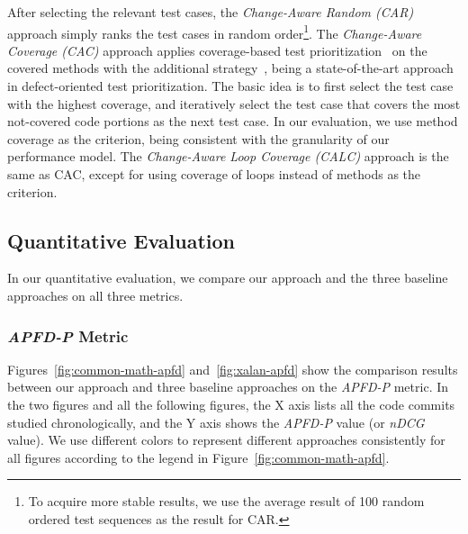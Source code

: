 After selecting the relevant test cases, the \textit{Change-Aware Random (CAR)} approach simply ranks the test cases in random order\footnote{To acquire more stable results, we use the average result of 100 random ordered test sequences as the result for CAR.}. The \textit{Change-Aware Coverage (CAC)} approach applies coverage-based test prioritization~\cite{Rother99:testprio} on the covered methods with the additional strategy~\cite{additionalTestPrior}, being a state-of-the-art approach in defect-oriented test prioritization. The basic idea is to first select the test case with the highest coverage, and iteratively select the test case that covers the most not-covered code portions as the next test case. In our evaluation, we use method coverage as the criterion, being consistent with the granularity of our performance model. The \textit{Change-Aware Loop Coverage (CALC)} approach is the same as CAC, except for using coverage of loops instead of methods as the criterion. 

\subsection{Quantitative Evaluation}
\label{subsec:results}
In our quantitative evaluation, we compare our approach and the three baseline approaches on all three metrics. 

\subsubsection{\textit{APFD-P} Metric}



Figures~\ref{fig:common-math-apfd} and~\ref{fig:xalan-apfd} show the comparison results between our approach and three baseline approaches on the \textit{APFD-P} metric. In the two figures and all the following figures, the X axis lists all the code commits studied chronologically, and the Y axis shows the \textit{APFD-P} value (or \textit{nDCG} value). We use different colors to represent different approaches consistently for all figures according to the legend in Figure~\ref{fig:common-math-apfd}. 

